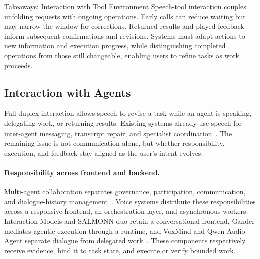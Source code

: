 \begin{TakeawayBox}{Takeaways: Interaction with Tool Environment}
Speech-tool interaction couples unfolding requests with ongoing operations. Early calls can reduce waiting but may narrow the window for corrections. Returned results and played feedback inform subsequent confirmations and revisions. Systems must adapt actions to new information and execution progress, while distinguishing completed operations from those still changeable, enabling users to refine tasks as work proceeds.
\end{TakeawayBox}

\subsection{Interaction with Agents}
\label{sec:interaction-with-agents}

Full-duplex interaction allows speech to revise a task while an agent is speaking, delegating work, or returning results. Existing systems already use speech for inter-agent messaging, transcript repair, and specialist coordination~\citep{DBLP:journals/corr/abs-2401-03945,DBLP:journals/corr/abs-2601-10223,DBLP:journals/corr/abs-2606-07397}. The remaining issue is not communication alone, but whether responsibility, execution, and feedback stay aligned as the user's intent evolves.

\paragraph{Responsibility across frontend and backend.}
Multi-agent collaboration separates governance, participation, communication, and dialogue-history management~\citep{DBLP:journals/corr/abs-2502-14321,WEB:acl/2025.acl-long.1037}. Voice systems distribute these responsibilities across a responsive frontend, an orchestration layer, and asynchronous workers: Interaction Models and SALMONN-duo retain a conversational frontend, Gander mediates agentic execution through a runtime, and VoxMind and Qwen-Audio-Agent separate dialogue from delegated work~\citep{WEB:thinkingmachines/interaction-models,DBLP:journals/corr/abs-2609-34247,DBLP:journals/corr/abs-2609-08977,DBLP:conf/acl/LiangCJCJLZPLZ26,DBLP:journals/corr/abs-2609-25195}. These components respectively receive evidence, bind it to task state, and execute or verify bounded work.

